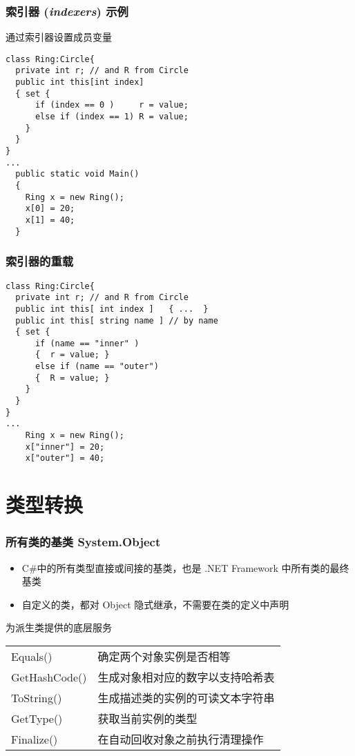\begin{frame}[fragile]
\frametitle{索引器 (\textit{indexers}) 示例}
通过索引器设置成员变量
\begin{lstlisting}
class Ring:Circle{
  private int r; // and R from Circle
  public int this[int index]
  { set {
      if (index == 0 )     r = value;
      else if (index == 1) R = value;
    }
  }
}
...
  public static void Main()
  {
    Ring x = new Ring();
    x[0] = 20;
    x[1] = 40;
  }
\end{lstlisting}
\end{frame}

\begin{frame}[fragile]
\frametitle{索引器的重载}
\begin{lstlisting}
class Ring:Circle{
  private int r; // and R from Circle
  public int this[ int index ]   { ...  }
  public int this[ string name ] // by name
  { set {
      if (name == "inner" )
      {  r = value; }
      else if (name == "outer")
      {  R = value; }
    }
  }
}
...
    Ring x = new Ring();
    x["inner"] = 20;
    x["outer"] = 40;
\end{lstlisting}


\end{frame}

\section{类型转换}

\begin{frame}
\frametitle{所有类的基类 System.Object}
\begin{itemize}
\item C\#中的所有类型直接或间接的基类，也是 .NET Framework 中所有类的最终基类
\item 自定义的类，都对 Object 隐式继承，不需要在类的定义中声明
\end{itemize}

\begin{block}{为派生类提供的底层服务}
  \begin{tabular}{l|l}
    Equals()      & 确定两个对象实例是否相等         \\
    GetHashCode() & 生成对象相对应的数字以支持哈希表 \\
    ToString()    & 生成描述类的实例的可读文本字符串 \\
    GetType()     & 获取当前实例的类型               \\
    Finalize()    & 在自动回收对象之前执行清理操作   \\
  \end{tabular}
  \normalfont
\end{block}
\end{frame}


